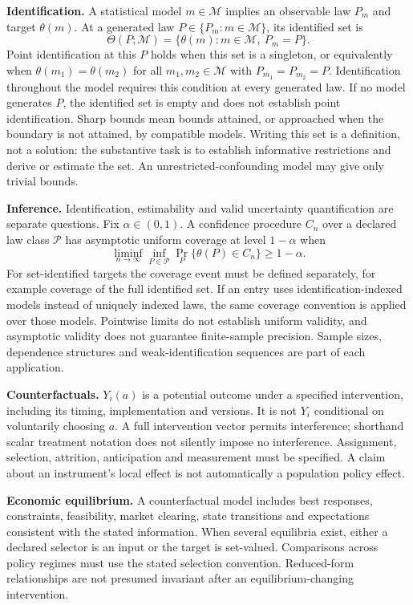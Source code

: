 \documentclass[11pt,a4paper]{article}
\begin{document}
\textbf{Identification.} A statistical model $m\in\mathcal M$ implies an observable law $P_m$ and target $\theta(m)$. At a generated law $P\in\{P_m:m\in\mathcal M\}$, its identified set is
\[
\Theta(P;\mathcal M)=\{\theta(m):m\in\mathcal M,\ P_m=P\}.
\]
Point identification at this $P$ holds when this set is a singleton, or equivalently when $\theta(m_1)=\theta(m_2)$ for all $m_1,m_2\in\mathcal M$ with $P_{m_1}=P_{m_2}=P$. Identification throughout the model requires this condition at every generated law. If no model generates $P$, the identified set is empty and does not establish point identification. Sharp bounds mean bounds attained, or approached when the boundary is not attained, by compatible models. Writing this set is a definition, not a solution: the substantive task is to establish informative restrictions and derive or estimate the set. An unrestricted-confounding model may give only trivial bounds.

\textbf{Inference.} Identification, estimability and valid uncertainty quantification are separate questions. Fix $\alpha\in(0,1)$. A confidence procedure $C_n$ over a declared law class $\mathcal P$ has asymptotic uniform coverage at level $1-\alpha$ when
\[
\liminf_{n\to\infty}\inf_{P\in\mathcal P}\Pr_P\{\theta(P)\in C_n\}\geq1-\alpha.
\]
For set-identified targets the coverage event must be defined separately, for example coverage of the full identified set. If an entry uses identification-indexed models instead of uniquely indexed laws, the same coverage convention is applied over those models. Pointwise limits do not establish uniform validity, and asymptotic validity does not guarantee finite-sample precision. Sample sizes, dependence structures and weak-identification sequences are part of each application.

\textbf{Counterfactuals.} $Y_i(a)$ is a potential outcome under a specified intervention, including its timing, implementation and versions. It is not $Y_i$ conditional on voluntarily choosing $a$. A full intervention vector permits interference; shorthand scalar treatment notation does not silently impose no interference. Assignment, selection, attrition, anticipation and measurement must be specified. A claim about an instrument's local effect is not automatically a population policy effect.

\textbf{Economic equilibrium.} A counterfactual model includes best responses, constraints, feasibility, market clearing, state transitions and expectations consistent with the stated information. When several equilibria exist, either a declared selector is an input or the target is set-valued. Comparisons across policy regimes must use the stated selection convention. Reduced-form relationships are not presumed invariant after an equilibrium-changing intervention.
\end{document}
